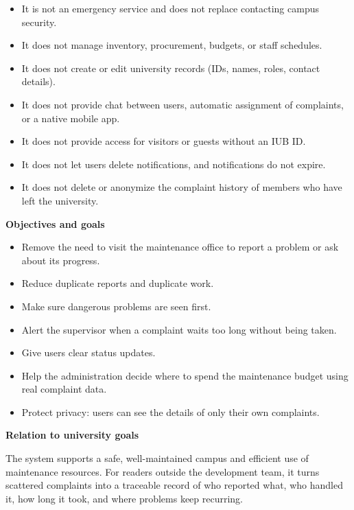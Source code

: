 \begin{itemize}
  \item It is not an emergency service and does not replace contacting campus security.
  \item It does not manage inventory, procurement, budgets, or staff schedules.
  \item It does not create or edit university records (IDs, names, roles, contact details).
  \item It does not provide chat between users, automatic assignment of complaints, or a native mobile app.
  \item It does not provide access for visitors or guests without an IUB ID.
  \item It does not let users delete notifications, and notifications do not expire.
  \item It does not delete or anonymize the complaint history of members who have left the university.
\end{itemize}

\textbf{Objectives and goals}

\begin{itemize}
  \item Remove the need to visit the maintenance office to report a problem or ask about its progress.
  \item Reduce duplicate reports and duplicate work.
  \item Make sure dangerous problems are seen first.
  \item Alert the supervisor when a complaint waits too long without being taken.
  \item Give users clear status updates.
  \item Help the administration decide where to spend the maintenance budget using real complaint data.
  \item Protect privacy: users can see the details of only their own complaints.
\end{itemize}

\textbf{Relation to university goals}

The system supports a safe, well-maintained campus and efficient use of maintenance resources. For readers outside the development team, it turns scattered complaints into a traceable record of who reported what, who handled it, how long it took, and where problems keep recurring.

